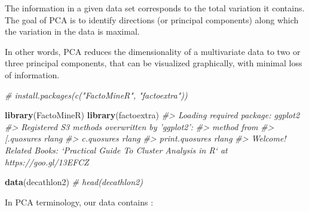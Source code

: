 \documentclass[]{book}
\newenvironment{Shaded}{\begin{snugshade}}{\end{snugshade}}
\newcommand{\CommentTok}[1]{\textcolor[rgb]{0.56,0.35,0.01}{\textit{#1}}}
\newcommand{\KeywordTok}[1]{\textcolor[rgb]{0.13,0.29,0.53}{\textbf{#1}}}
\newcommand{\NormalTok}[1]{#1}
\begin{document}
The information in a given data set corresponds to the total variation it contains. The goal of PCA is to identify directions (or principal components) along which the variation in the data is maximal.

In other words, PCA reduces the dimensionality of a multivariate data to two or three principal components, that can be visualized graphically, with minimal loss of information.

\begin{Shaded}
\begin{Highlighting}[]
\CommentTok{# install.packages(c("FactoMineR", "factoextra"))}
\end{Highlighting}
\end{Shaded}

\begin{Shaded}
\begin{Highlighting}[]
\KeywordTok{library}\NormalTok{(FactoMineR)}
\KeywordTok{library}\NormalTok{(factoextra)}
\CommentTok{#> Loading required package: ggplot2}
\CommentTok{#> Registered S3 methods overwritten by 'ggplot2':}
\CommentTok{#>   method         from }
\CommentTok{#>   [.quosures     rlang}
\CommentTok{#>   c.quosures     rlang}
\CommentTok{#>   print.quosures rlang}
\CommentTok{#> Welcome! Related Books: `Practical Guide To Cluster Analysis in R` at https://goo.gl/13EFCZ}
\end{Highlighting}
\end{Shaded}

\begin{Shaded}
\begin{Highlighting}[]
\KeywordTok{data}\NormalTok{(decathlon2)}
\CommentTok{# head(decathlon2)}
\end{Highlighting}
\end{Shaded}

In PCA terminology, our data contains :
\end{document}
